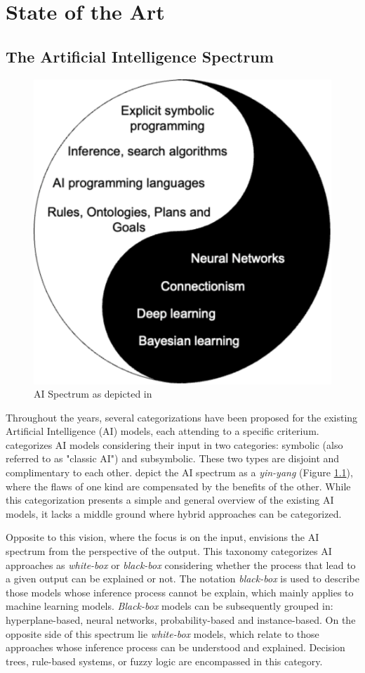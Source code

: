 \chapter{State of the Art}
\label{chap:soa}

\section{The Artificial Intelligence Spectrum} \label{sec:the_ai_spectrum}

\begin{figure}
    \centering
    \includegraphics[width=.5\linewidth]{2_stateoftheart/figures/Lieberman_taxonomy.eps}
    \caption{AI Spectrum as depicted in \cite{lieberman_symbolic_nodate}}
    \label{fig:lieberman_tax}
\end{figure}

Throughout the years, several categorizations have been proposed for the existing Artificial Intelligence (AI) models, each attending to a specific criterium. \cite{lieberman_symbolic_nodate} categorizes AI models considering their input in two categories: symbolic (also referred to as "classic AI") and subsymbolic. These two types are disjoint and complimentary to each other. \cite{lieberman_symbolic_nodate} depict the AI spectrum as a \textit{yin-yang} (Figure \ref{fig:lieberman_tax}), where the flaws of one kind are compensated by the benefits of the other. While this categorization presents a simple and general overview of the existing AI models, it lacks a middle ground where hybrid approaches can be categorized. 

Opposite to this vision, where the focus is on the input, \cite{loyola-gonzalez_black-box_2019} envisions the AI spectrum from the perspective of the output. This taxonomy categorizes AI approaches as \textit{white-box} or \textit{black-box} considering whether the process that lead to a given output can be explained or not. The notation \textit{black-box} is used to describe those models whose inference process cannot be explain, which mainly applies to machine learning models.  \textit{Black-box} models can be subsequently grouped in: hyperplane-based, neural networks, probability-based and instance-based. On the opposite side of this spectrum lie \textit{white-box} models, which relate to those approaches whose inference process can be understood and explained. Decision trees, rule-based systems, or fuzzy logic are encompassed in this category.


